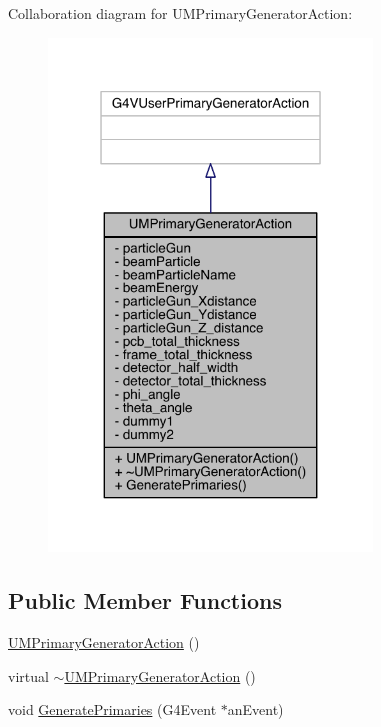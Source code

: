 Collaboration diagram for U\+M\+Primary\+Generator\+Action\+:
\nopagebreak
\begin{figure}[H]
\begin{center}
\leavevmode
\includegraphics[width=244pt]{classUMPrimaryGeneratorAction__coll__graph}
\end{center}
\end{figure}
\subsection*{Public Member Functions}
\begin{DoxyCompactItemize}
\item 
\hyperlink{classUMPrimaryGeneratorAction_a2be9dfff9f8b8142a3c550503647cd4e}{U\+M\+Primary\+Generator\+Action} ()
\item 
virtual \hyperlink{classUMPrimaryGeneratorAction_a2da0583ffcf7339c335beeadf33b0bcb}{$\sim$\+U\+M\+Primary\+Generator\+Action} ()
\item 
void \hyperlink{classUMPrimaryGeneratorAction_a40f908530ea769019180454cfe529d22}{Generate\+Primaries} (G4\+Event $\ast$an\+Event)
\end{DoxyCompactItemize}
